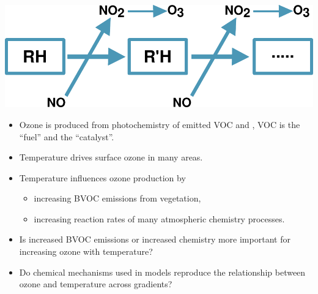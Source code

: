 \begin{BlueBox}
    \vskip-1cm
    \begin{block}{}
        \includegraphics[width=\textwidth]{VOC_Oxidation} \vspace{5mm}
        \begin{itemize}
            \item Ozone is produced from photochemistry of emitted VOC and , VOC is the ``fuel'' and  the ``catalyst''. \vspace{10mm}
            \item Temperature drives surface ozone in many areas. \vspace{10mm}
            \item Temperature influences ozone production by \vspace{4mm}
                \begin{itemize}
                    \item increasing BVOC emissions from vegetation, 
                    \item increasing reaction rates of many atmospheric chemistry processes.  \vspace{10mm}
                \end{itemize}
            \item Is increased BVOC emissions or increased chemistry more important for increasing ozone with temperature? \vspace{-3mm}
            \item Do chemical mechanisms used in models reproduce the relationship between ozone and temperature across  gradients? \vspace{10mm}
        \end{itemize}
    \end{block}
\end{BlueBox}
